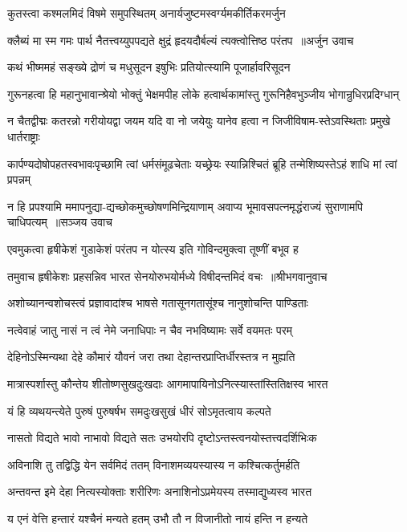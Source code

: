 \twolineshloka
{कुतस्त्वा कश्मलमिदं विषमे समुपस्थितम्}
{अनार्यजुष्टमस्वर्ग्यमकीर्तिकरमर्जुन}


\threelineshloka
{क्लैब्यं मा स्म गमः पार्थ नैतत्त्वय्युपपद्यते}
{क्षुद्रं हृदयदौर्बल्यं त्यक्त्वोत्तिष्ठ परंतप ॥अर्जुन उवाच}
{}


\twolineshloka
{कथं भीष्ममहं सङ्ख्ये द्रोणं च मधुसूदन}
{इषुभिः प्रतियोत्स्यामि पूजार्हावरिसूदन}


\twolineshloka
{गुरूनहत्वा हि महानुभावान्श्रेयो भोक्तुं भेक्षमपीह लोके}
{हत्वार्थकामांस्तु गुरूनिहैवभुञ्जीय भोगान्रुधिरप्रदिग्धान्}


\twolineshloka
{न चैतद्वीद्मः कतरन्नो गरीयोयद्वा जयम यदि वा नो जयेयुः}
{यानेव हत्वा न जिजीविषाम-स्तेऽवस्थिताः प्रमुखे धार्तराष्ट्राः}


\twolineshloka
{कार्पण्यदोषोपहतस्वभावःपृच्छामि त्वां धर्मसंमूढचेताः}
{यच्छ्रेयः स्यान्निश्चितं ब्रूहि तन्मेशिष्यस्तेऽहं शाधि मां त्वां प्रपन्नम्}


\threelineshloka
{न हि प्रपश्यामि ममापनुद्या-द्यच्छोकमुच्छोषणमिन्द्रियाणाम्}
{अवाप्य भूमावसपत्नमृद्धंराज्यं सुराणामपि चाधिपत्यम् ॥सञ्जय उवाच}
{}


\twolineshloka
{एवमुकत्वा हृषीकेशं गुडाकेशं परंतप}
{न योत्स्य इति गोविन्दमुक्त्वा तूष्णीं बभूव ह}


\threelineshloka
{तमुवाच हृषीकेशः प्रहसन्निव भारत}
{सेनयोरुभयोर्मध्ये विषीदन्तमिदं वचः ॥श्रीभगवानुवाच}
{}


\twolineshloka
{अशोच्यानन्वशोचस्त्वं प्रज्ञावादांश्च भाषसे}
{गतासूनगतासूंश्च नानुशोचन्ति पाण्डिताः}


\twolineshloka
{नत्वेवाहं जातु नासं न त्वं नेमे जनाधिपाः}
{न चैव नभविष्यामः सर्वे वयमतः परम्}


\twolineshloka
{देहिनोऽस्मिन्यथा देहे कौमारं यौवनं जरा}
{तथा देहान्तरप्राप्तिर्धीरस्तत्र न मुह्यति}


\twolineshloka
{मात्रास्पर्शास्तु कौन्तेय शीतोष्णसुखदुःखदाः}
{आगमापायिनोऽनित्स्यास्तांस्तितिक्षस्व भारत}


\twolineshloka
{यं हि व्यथयन्त्येते पुरुषं पुरुषर्षभ}
{समदुःखसुखं धीरं सोऽमृतत्वाय कल्पते}


\twolineshloka
{नासतो विद्यते भावो नाभावो विद्यते सतः}
{उभयोरपि दृष्टोऽन्तस्त्वनयोस्तत्त्वदर्शिभिःक}


\twolineshloka
{अविनाशि तु तद्विद्धि येन सर्वमिदं ततम्}
{विनाशमव्ययस्यास्य न कश्चित्कर्तुमर्हति}


\twolineshloka
{अन्तवन्त इमे देहा नित्यस्योक्ताः शरीरिणः}
{अनाशिनोऽप्रमेयस्य तस्माद्युध्यस्व भारत}


\twolineshloka
{य एनं वेत्ति हन्तारं यश्चैनं मन्यते हतम्}
{उभौ तौ न विजानीतो नायं हन्ति न हन्यते}



